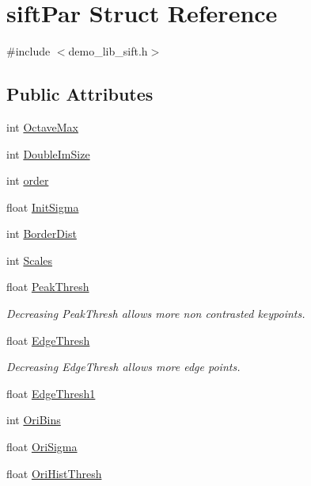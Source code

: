 \hypertarget{structsiftPar}{}\section{sift\+Par Struct Reference}
\label{structsiftPar}


{\ttfamily \#include $<$demo\+\_\+lib\+\_\+sift.\+h$>$}

\subsection*{Public Attributes}
\begin{DoxyCompactItemize}
\item 
int \hyperlink{structsiftPar_ad593cbf478da51b979639109bf6cce27}{Octave\+Max}
\item 
int \hyperlink{structsiftPar_a1898a6265c02a51783bb522a24d5028d}{Double\+Im\+Size}
\item 
int \hyperlink{structsiftPar_a6b83bbadd980b35995019d6ece94a251}{order}
\item 
float \hyperlink{structsiftPar_a79b3baae13768f0262590f9a3ade73c9}{Init\+Sigma}
\item 
int \hyperlink{structsiftPar_a5a14761eed5225db50538dfb72eef86d}{Border\+Dist}
\item 
int \hyperlink{structsiftPar_ae116396e6087d1ce9c9feeae64dd2c8d}{Scales}
\item 
float \hyperlink{structsiftPar_ad1996ed38b7c422e7b57837f38c2a72d}{Peak\+Thresh}
\begin{DoxyCompactList}\small\item\em Decreasing Peak\+Thresh allows more non contrasted keypoints. \end{DoxyCompactList}\item 
float \hyperlink{structsiftPar_a37fe7d87b5ddf9a82156abebebc66b0f}{Edge\+Thresh}
\begin{DoxyCompactList}\small\item\em Decreasing Edge\+Thresh allows more edge points. \end{DoxyCompactList}\item 
float \hyperlink{structsiftPar_a9bfb0d848b2e7d464de35bc836f8250b}{Edge\+Thresh1}
\item 
int \hyperlink{structsiftPar_a374c99ffff530e66fcd859be26319848}{Ori\+Bins}
\item 
float \hyperlink{structsiftPar_ab250ea64745ea3c2f43d2702c08b70e1}{Ori\+Sigma}
\item 
float \hyperlink{structsiftPar_a3f6cf5b8f854ccb50d224e94de29891c}{Ori\+Hist\+Thresh}

\end{DoxyCompactItemize}
